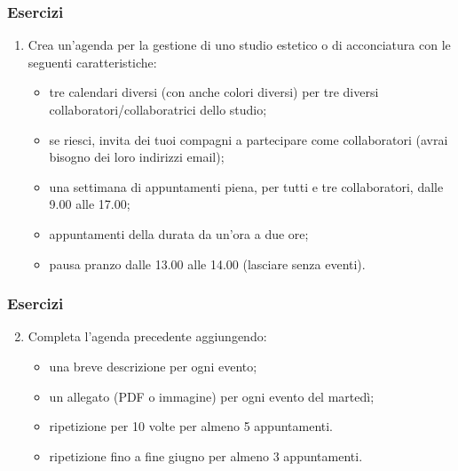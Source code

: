 \documentclass[]{beamer}
\begin{document}
\begin{frame}
\frametitle{Esercizi}
\begin{enumerate}
  \item Crea un'agenda per la gestione di uno studio estetico o di acconciatura con le seguenti caratteristiche:
  \begin{itemize}
    \item tre calendari diversi (con anche colori diversi) per tre diversi collaboratori/collaboratrici dello studio;
    \item se riesci, invita dei tuoi compagni a partecipare come collaboratori (avrai bisogno dei loro indirizzi email);
    \item una settimana di appuntamenti piena, per tutti e tre collaboratori, dalle 9.00 alle 17.00;
    \item appuntamenti della durata da un'ora a due ore;
    \item pausa pranzo dalle 13.00 alle 14.00 (lasciare senza eventi).
  \end{itemize}
\end{enumerate}
\end{frame}

\begin{frame}
  \frametitle{Esercizi}
  \begin{enumerate}\setcounter{enumi}{1}
    \item Completa l'agenda precedente aggiungendo:
    \begin{itemize}
      \item una breve descrizione per ogni evento;
      \item un allegato (PDF o immagine) per ogni evento del martedì;
      \item ripetizione per 10 volte per almeno 5 appuntamenti.
      \item ripetizione fino a fine giugno per almeno 3 appuntamenti.
    \end{itemize}
  \end{enumerate}
\end{frame}
\end{document}
